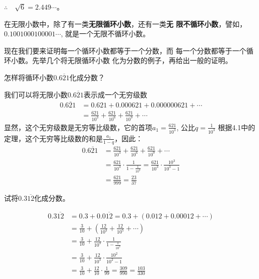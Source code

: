 $\therefore\quad \sqrt{6}=2.449\cdots$。

在无限小数中，除了有一类\textbf{无限循环小数}，还有一类\textbf{无
限不循环小数}，譬如，$0.1001000100001\cdots$,
就是一个无限不循环小数。

现在我们要来证明每一个循环小数都等于一个分数，而
每一个分数都等于一个循环小数。先举几个将无限循环小数
化为分数的例子，再给出一般的证明。


\begin{example}
    怎样将循环小数$0.\overline{621}$化成分数？
\end{example}

\begin{solution}
    我们可以将无限小数$0.\overline{621}$表示成一个无穷级数
\[\begin{split}
0.\overline{621}&=0.621+0.000621+0.000000621+\cdots\\
&=\frac{621}{10^3}+\frac{621}{10^6}+\frac{621}{10^9}+\cdots
\end{split}\]
显然，这个无穷级数是无穷等比级数，它的首项$a_1=\frac{621}{10^3}$, 公比$q=\frac{1}{10^3}$
根据4.1中的定理，这个无穷等比级数的和是$\frac{a_1}{1-q}$，因此：
\[\begin{split}
    0.\overline{621}&=\frac{621}{10^3}+\frac{621}{10^6}+\frac{621}{10^9}+\cdots\\
    &=\frac{621}{10^3}\cdot \frac{1}{1-\frac{1}{10^3}}=\frac{621}{10^3}\cdot \frac{10^3}{10^3-1}\\
    &=\frac{621}{999}=\frac{23}{37}
\end{split}\]
\end{solution}

\begin{example}
试将$0.3\overline{12}$化成分数。
\end{example}

\begin{solution}
\[\begin{split}
    0.3\overline{12}&= 0.3+0.0\overline{12}=0.3+(0.012+0.00012+\cdots)\\
    &=\frac{3}{10}+\left(\frac{12}{10^3}+\frac{12}{10^5}+\cdots\right)\\
    &=\frac{3}{10}+\frac{12}{10^3}\cdot \frac{1}{1-\frac{1}{10^2}}\\
    &=\frac{3}{10}+\frac{12}{10^3}\cdot \frac{10^2}{10^2-1}\\
    &=\frac{3}{10}+\frac{12}{10}\cdot \frac{1}{99}=\frac{309}{990}=\frac{103}{330}
\end{split}\]
\end{solution}

